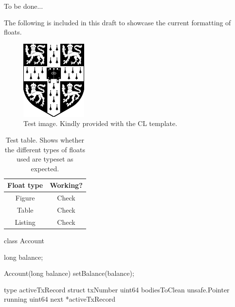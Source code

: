 \documentclass[12pt,a4paper,twoside,openright]{report}
\newcommand{\mycaption}[2]{\caption[#1]{#1 #2}}
\newcommand{\TOBEDONE}{{\LARGE To be done...}}
\newcommand{\javaClass}[1]{\texttt{#1}}
\newcommand{\javaMethod}[1]{\texttt{#1}}
\newcommand{\goType}[1]{\texttt{#1}}
\begin{document}
\TOBEDONE

The following is included in this draft to showcase the current
formatting of floats.

\begin{figure}[h]
  \centering \includegraphics{cuarms.pdf} \mycaption{Test
    image.}{Kindly provided with the CL template.}
\end{figure}

\begin{table}[h]
  \centering
  \begin{tabular}{| c | c |}
    \hline
    Float type & Working? \\
    \hline
    Figure & Check \\
    Table & Check \\
    Listing & Check \\
    \hline
  \end{tabular}
  \mycaption{Test table.}{Shows whether the different types of floats
    used are typeset as expected.}
\end{table}

\begin{Listing}
  \begin{JavaCode}
    class Account { long balance;
      
      Account(long balance) { setBalance(balance); } }
  \end{JavaCode}
  \mycaption{A non-thread-safe class \javaClass{Account} in Java with
    the basic \javaMethod{getBalance}, \javaMethod{deposit}, and
    \javaMethod{withdraw} operations.}{Some extra stuff here.}
  \label{lst:account}
\end{Listing}

\begin{Listing}
  \begin{GoCode}
    type activeTxRecord struct { txNumber uint64 bodiesToClean
      unsafe.Pointer running uint64 next *activeTxRecord }
  \end{GoCode}
  \mycaption{Example Go code.}{The \goType{activeTxRecord} type.}
  \label{lst:account}
\end{Listing}
\end{document}
